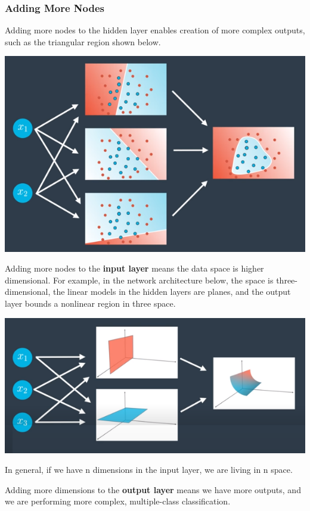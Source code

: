 \subsubsection{Adding More Nodes}
Adding more nodes to the hidden layer enables creation of more complex outputs, such as the triangular region shown below.

\includegraphics[width=1\linewidth]{img//intro//introNN/neural-network-architecture-10.png}

Adding more nodes to the \textbf{input layer} means the data space is higher dimensional. For example, in the network architecture below, the space is three-dimensional, the linear models in the hidden layers are planes, and the output layer bounds a nonlinear region in three space.

\includegraphics[width=1\linewidth]{img//intro//introNN/neural-network-architecture-11.png}

In general, if we have n dimensions in the input layer, we are living in n space. \newline

Adding more dimensions to the \textbf{output layer} means we have more outputs, and we are performing more complex, multiple-class classification.

